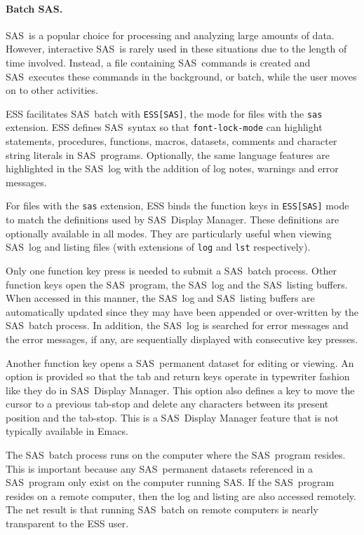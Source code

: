 \documentclass{article}
\newcommand*{\SAS}{\textsc{SAS}}
\newcommand{\stexttt}[1]{{\small\texttt{#1}}}
\begin{document}
\paragraph{Batch \SAS.}
\label{sec:sas-batch}

\SAS\ is a popular choice for processing and analyzing large amounts
of data.  However, interactive \SAS\ is rarely used in these situations
due to the length of time involved.  Instead, a file containing \SAS\ 
commands is created and \SAS\ executes these commands in the background, 
or batch, while the user moves on to other activities.

ESS facilitates \SAS\ batch with \stexttt{ESS[SAS]}, the mode for files
with the \stexttt{sas} extension.  ESS defines \SAS\ syntax so that
\stexttt{font-lock-mode} can highlight statements, procedures,
functions, macros, datasets, comments and character string literals in
\SAS\ programs.  Optionally, the same language features are
highlighted in the \SAS\ log with the addition of log notes, warnings
and error messages.

For files with the \stexttt{sas} extension, ESS binds the function
keys in \stexttt{ESS[SAS]} mode to match the definitions used by \SAS\ 
Display Manager.  These definitions are optionally available in all
modes.  They are particularly useful when viewing \SAS\ log and
listing files (with extensions of \stexttt{log} and \stexttt{lst}
respectively).

Only one function key press is needed to submit a \SAS\ batch process.
Other function keys open the \SAS\ program, the \SAS\ log and the
\SAS\ listing buffers.  When accessed in this manner, the \SAS\ log
and \SAS\ listing buffers are automatically updated since they may
have been appended or over-written by the \SAS\ batch process.  In
addition, the \SAS\ log is searched for error messages and the error
messages, if any, are sequentially displayed with consecutive key
presses.

Another function key opens a \SAS\ permanent dataset for editing or
viewing.  An option is provided so that the tab and return keys
operate in typewriter fashion like they do in \SAS\ Display Manager.
This option also defines a key to move the cursor to a previous
tab-stop and delete any characters between its present position and
the tab-stop.  This is a \SAS\ Display Manager feature that is not
typically available in Emacs.

The \SAS\ batch process runs on the computer where the \SAS\ program
resides.  This is important because any \SAS\ permanent datasets 
referenced in a \SAS\ program only exist on the computer running \SAS.  
If the \SAS\ program resides on a remote computer, then the
log and listing are also accessed remotely.  The net result is that
running \SAS\ batch on remote computers is nearly transparent to the
ESS user.
\end{document}
